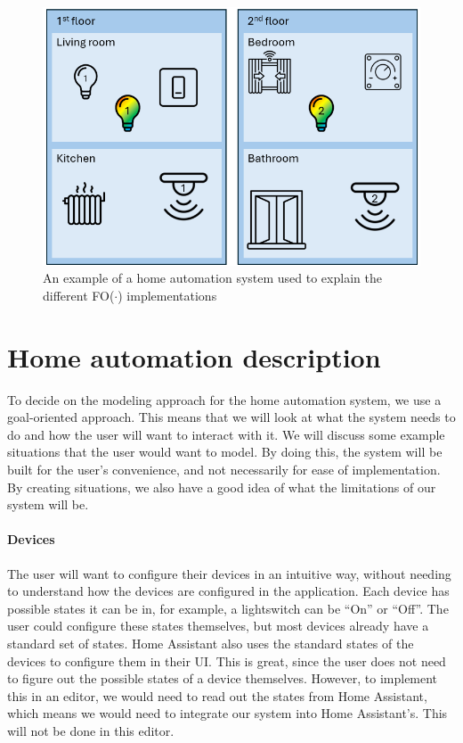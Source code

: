 \documentclass[11pt,a4paper]{report}
\newcommand{\fodot}{FO($\cdot$)\xspace}
\begin{document}
\begin{figure}
    \centering
    \includegraphics[width=0.8\linewidth]{images/fodot-structure_example.png}
    \caption{An example of a home automation system used to explain the different \fodot implementations}
    \label{fig:fodot-structure_example}
\end{figure}

\section{Home automation description}
To decide on the modeling approach for the home automation system, we use a goal-oriented approach. This means that we will look at what the system needs to do and how the user will want to interact with it. We will discuss some example situations that the user would want to model. By doing this, the system will be built for the user's convenience, and not necessarily for ease of implementation. By creating situations, we also have a good idea of what the limitations of our system will be.

\paragraph{Devices}
The user will want to configure their devices in an intuitive way, without needing to understand how the devices are configured in the application. Each device has possible states it can be in, for example, a lightswitch can be ``On'' or ``Off''. The user could configure these states themselves, but most devices already have a standard set of states. Home Assistant also uses the standard states of the devices to configure them in their UI. This is great, since the user does not need to figure out the possible states of a device themselves. However, to implement this in an editor, we would need to read out the states from Home Assistant, which means we would need to integrate our system into Home Assistant's. This will not be done in this editor.
\end{document}

